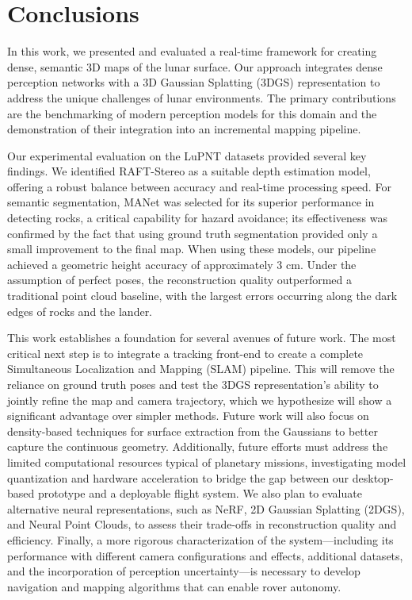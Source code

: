 \section{Conclusions}
\label{sec:conclusion}
In this work, we presented and evaluated a real-time framework for creating dense, semantic 3D maps of the lunar surface. Our approach integrates dense perception networks with a 3D Gaussian Splatting (3DGS) representation to address the unique challenges of lunar environments. The primary contributions are the benchmarking of modern perception models for this domain and the demonstration of their integration into an incremental mapping pipeline.

Our experimental evaluation on the LuPNT datasets provided several key findings. We identified RAFT-Stereo as a suitable depth estimation model, offering a robust balance between accuracy and real-time processing speed. For semantic segmentation, MANet was selected for its superior performance in detecting rocks, a critical capability for hazard avoidance; its effectiveness was confirmed by the fact that using ground truth segmentation provided only a small improvement to the final map. When using these models, our pipeline achieved a geometric height accuracy of approximately 3 cm. Under the assumption of perfect poses, the reconstruction quality outperformed a traditional point cloud baseline, with the largest errors occurring along the dark edges of rocks and the lander.

This work establishes a foundation for several avenues of future work. The most critical next step is to integrate a tracking front-end to create a complete Simultaneous Localization and Mapping (SLAM) pipeline. This will remove the reliance on ground truth poses and test the 3DGS representation's ability to jointly refine the map and camera trajectory, which we hypothesize will show a significant advantage over simpler methods. Future work will also focus on density-based techniques for surface extraction from the Gaussians to better capture the continuous geometry. Additionally, future efforts must address the limited computational resources typical of planetary missions, investigating model quantization and hardware acceleration to bridge the gap between our desktop-based prototype and a deployable flight system. We also plan to evaluate alternative neural representations, such as NeRF, 2D Gaussian Splatting (2DGS), and Neural Point Clouds, to assess their trade-offs in reconstruction quality and efficiency. Finally, a more rigorous characterization of the system—including its performance with different camera configurations and effects, additional datasets, and the incorporation of perception uncertainty—is necessary to develop navigation and mapping algorithms that can enable rover autonomy.